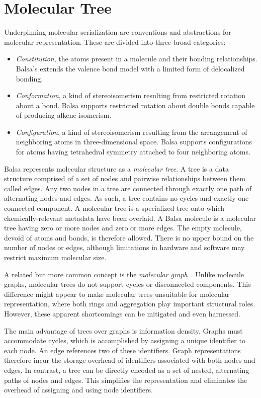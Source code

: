 \documentclass{article}
\begin{document}
\section*{Molecular Tree}
\label{molecular-tree}

Underpinning molecular serialization are conventions and abstractions for molecular representation. These are divided into three broad categories:

\begin{itemize}
\item \textit{Constitution}, the atoms present in a molecule and their bonding relationships. Balsa's extends the valence bond model with a limited form of delocalized bonding.
\item \textit{Conformation}, a kind of stereoisomerism resulting from restricted rotation about a bond. Balsa supports restricted rotation about double bonds capable of producing alkene isomerism.
\item \textit{Configuration}, a kind of stereoisomerism resulting from the arrangement of neighboring atoms in three-dimensional space. Balsa supports configurations for atoms having tetrahedral symmetry attached to four neighboring atoms.
\end{itemize}

Balsa represents molecular structure as a \textit{molecular tree}. A tree is a data structure comprised of a set of nodes and pairwise relationships between them called edges. Any two nodes in a tree are connected through exactly one path of alternating nodes and edges. As such, a tree contains no cycles and exactly one connected component. A molecular tree is a specialized tree onto which chemically-relevant metadata have been overlaid. A Balsa molecule is a molecular tree having zero or more nodes and zero or more edges. The empty molecule, devoid of atoms and bonds, is therefore allowed. There is no upper bound on the number of nodes or edges, although limitations in hardware and software may restrict maximum molecular size.

A related but more common concept is the \textit{molecular graph}~\cite{balaban:1985}. Unlike molecule graphs, molecular trees do not support cycles or disconnected components. This difference might appear to make molecular trees unsuitable for molecular representation, where both rings and aggregation play important structural roles. However, these apparent shortcomings can be mitigated and even harnessed.

The main advantage of trees over graphs is information density. Graphs must accommodate cycles, which is accomplished by assigning a unique identifier to each node. An edge references two of these identifiers. Graph representations therefore incur the storage overhead of identifiers associated with both nodes and edges. In contrast, a tree can be directly encoded as a set of nested, alternating paths of nodes and edges. This simplifies the representation and eliminates the overhead of assigning and using node identifiers. 
\end{document}
